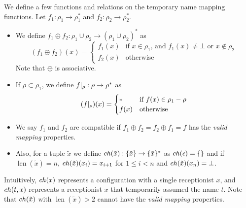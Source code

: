 We define a few functions and relations
on the temporary name mapping functions.
Let $f_1: \rho_1 \to \rho_1^*$ and  $f_2: \rho_2 \to \rho_2^*$.

\begin{itemize}
  \item
    We define $f_1 \oplus f_2: \rho_1 \cup \rho_2 \to (\rho_1 \cup \rho_2)^*$ as
    \begin{equation*}
      (f_1 \oplus f_2)(x) =
      \begin{cases}
        f_1(x) &\text{if $x \in \rho_1$, and $f_1(x) \neq \bot$ or $x \notin \rho_2$}\\
        f_2(x) &\text{otherwise}
      \end{cases}
    \end{equation*}
    Note that $\oplus$ is associative.
  \item
    If $\rho\subset\rho_1$, we define $f |_{\rho}: \rho\to\rho^*$ as
    \begin{equation*}
      (f |_{\rho})(x) =
      \begin{cases}
        *    &\text{if $f(x) \in \rho_1 - \rho$}\\
        f(x) &\text{otherwise}
      \end{cases}
    \end{equation*}
  \item
    We say $f_1$ and $f_2$ are compatible if
    $f_1 \oplus f_2 = f_2 \oplus f_1 = f$
    has the \emph{valid mapping} properties.
  \item
    Also, for a tuple $\tilde{x}$ we define
    $ch(\tilde{x}): \{\tilde{x}\} \to \{\tilde{x}\}^*$
    as
    $ch(\epsilon) = \{\}$
    and if $\operatorname{len}(\tilde{x}) = n$,
    $ch(\tilde{x})(x_i) = x_{i+1}$ for $1 \leq i < n$
    and
    $ch(\tilde{x})(x_n) = \bot$.
\end{itemize}

Intuitively,
$ch(x)$ represents a configuration with a single receptionist $x$, and
$ch(t,x)$ represents a receptionist $x$ that temporarily assumed the name $t$.
Note that $ch(\tilde{x})$ with $\operatorname{len}(\tilde{x}) > 2$
cannot have the \emph{valid mapping} properties.

